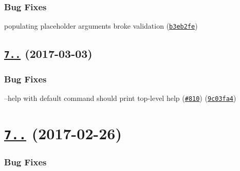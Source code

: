 \subsubsection*{Bug Fixes}


\begin{DoxyItemize}
\item populating placeholder arguments broke validation (\href{https://github.com/yargs/yargs/commit/b3eb2fe}{\tt b3eb2fe})
\end{DoxyItemize}

\label{_7.0.1}%
 \subsection*{\href{https://github.com/yargs/yargs/compare/v7.0.0...v7.0.1}{\tt 7..} (2017-\/03-\/03)}

\subsubsection*{Bug Fixes}


\begin{DoxyItemize}
\item --help with default command should print top-\/level help (\href{https://github.com/yargs/yargs/issues/810}{\tt \#810}) (\href{https://github.com/yargs/yargs/commit/9c03fa4}{\tt 9c03fa4})
\end{DoxyItemize}

\label{_7.0.0}%
 \section*{\href{https://github.com/yargs/yargs/compare/v6.6.0...v7.0.0}{\tt 7..} (2017-\/02-\/26)}

\subsubsection*{Bug Fixes}


